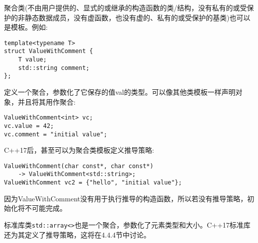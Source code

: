 
聚合类(不由用户提供的、显式的或继承的构造函数的类/结构，没有私有的或受保护的非静态数据成员，没有虚函数，也没有虚的、私有的或受保护的基类)也可以是模板。例如:

\begin{lstlisting}[style=styleCXX]
template<typename T>
struct ValueWithComment {
	T value;
	std::string comment;
};
\end{lstlisting}

定义一个聚合，参数化了它保存的值val的类型。可以像其他类模板一样声明对象，并且将其用作聚合:

\begin{lstlisting}[style=styleCXX]
ValueWithComment<int> vc;
vc.value = 42;
vc.comment = "initial value";
\end{lstlisting}

C++17后，甚至可以为聚合类模板定义推导策略:

\begin{lstlisting}[style=styleCXX]
ValueWithComment(char const*, char const*)
	-> ValueWithComment<std::string>;
ValueWithComment vc2 = {"hello", "initial value"};
\end{lstlisting}

因为ValueWithComment没有用于执行推导的构造函数，所以若没有推导策略，初始化将不可能完成。

标准库类\texttt{std::array<>}也是一个聚合，参数化了元素类型和大小。C++17标准库还为其定义了推导策略，这将在4.4.4节中讨论。
